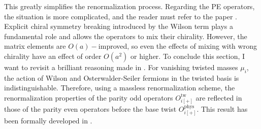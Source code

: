 \documentclass[english, LaM, oneside, noexaminfo]{sapthesis}
\newcommand{\oaid}{$O(a)-$improved}
\begin{document}
This greatly simplifies the renormalization process.
Regarding the PE operators, the situation is more complicated, and the reader must refer to the paper \cite{DoniniMartinelliOperators}.
Explicit chiral symmetry breaking introduced by the Wilson term plays a fundamental role and allows the operators to mix their chirality.
However, the matrix elements are \oaid, so even the effects of mixing with wrong chirality have an effect of order $O(a^2)$ or higher.
\newline
To conclude this section, I want to revisit a brilliant reasoning made in \cite{KMBSM}.
For vanishing twisted masses $\mu_i$, the action of Wilson and Osterwalder-Seiler fermions in the twisted basis is indistinguishable.
Therefore, using a massless renormalization scheme, the renormalization properties of the parity odd operators $O_{i[+]}^\text{tw}$ are reflected in those of the parity even operators before the base twist $O_{i[+]}^\text{phys}$.
This result has been formally developed in \cite{FR2}.
\end{document}
